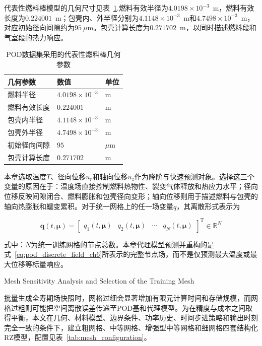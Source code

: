 代表性燃料棒模型的几何尺寸见表~\ref{tab:pod_geometry}.燃料有效半径为$4.0198\times10^{-3}$~m，燃料有效长度为$0.224001$~m；包壳内、外半径分别为$4.1148\times10^{-3}$~m和$4.7498\times10^{-3}$~m，对应初始径向间隙约为$95~\mu$m。包壳计算长度为$0.271702$~m，以同时描述燃料段和气室段的热力响应。

\begin{table}[htbp]
	\centering
	\caption{POD数据集采用的代表性燃料棒几何参数}
	\label{tab:pod_geometry}
	\begin{tabularx}{\textwidth}
		{>{\centering\arraybackslash}X
			>{\centering\arraybackslash}p{3.0cm}
			>{\centering\arraybackslash}p{3.0cm}}
		\toprule
		几何参数 & 数值 & 单位 \\
		\midrule
		燃料半径 & $4.0198\times10^{-3}$ & m \\
		燃料有效长度 & $0.224001$ & m \\
		包壳内半径 & $4.1148\times10^{-3}$ & m \\
		包壳外半径 & $4.7498\times10^{-3}$ & m \\
		初始径向间隙 & $95$ & $\mu$m \\
		包壳计算长度 & $0.271702$ & m \\
		\bottomrule
	\end{tabularx}
\end{table}

本章选取温度$T$、径向位移$u_r$和轴向位移$u_z$作为降阶与快速预测对象。选择这三个变量的原因在于：温度场直接控制燃料热物性、裂变气体释放和热应力水平；径向位移反映间隙闭合、燃料膨胀和包壳径向变形；轴向位移则用于描述燃料与包壳的轴向热膨胀和蠕变累积。对于统一网格上的任一场变量$q$，其离散形式表示为

\begin{equation}
	\boldsymbol{q}(t,\boldsymbol{\mu})
	=
	\begin{bmatrix}
		q_1(t,\boldsymbol{\mu}) &
		q_2(t,\boldsymbol{\mu}) &
		\cdots &
		q_N(t,\boldsymbol{\mu})
	\end{bmatrix}^{\mathrm T}
	\in\mathbb{R}^{N}
	\label{eq:pod_discrete_field_ch6}
\end{equation}

式中：$N$为统一训练网格的节点总数。本章代理模型预测并重构的是式~\eqref{eq:pod_discrete_field_ch6}所表示的完整节点场，而不是仅预测最大温度或最大位移等标量响应。

{Mesh Sensitivity Analysis and Selection of the Training Mesh}

批量生成全寿期场快照时，网格过细会显著增加有限元计算时间和存储规模，而网格过粗则可能把空间离散误差传递至POD基和代理模型。为在精度与成本之间取得平衡，本文在几何、材料模型、边界条件、功率历史、时间步进策略和输出时刻完全一致的条件下，建立粗网格、中等网格、增强型中等网格和细网格四套结构化RZ模型，配置见表~\ref{tab:mesh_configuration}。

